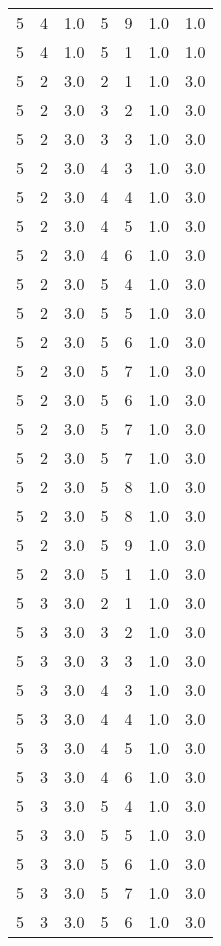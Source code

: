 \documentclass[a4paper,12pt]{article}
\begin{document}
\begin{center}
\begin{longtable}{ c c c | c c c | c }
        5 & 4 & 1.0 & 5 & 9 & 1.0 & 1.0 \\
        5 & 4 & 1.0 & 5 & 1 & 1.0 & 1.0 \\
        5 & 2 & 3.0 & 2 & 1 & 1.0 & 3.0 \\
        5 & 2 & 3.0 & 3 & 2 & 1.0 & 3.0 \\
        5 & 2 & 3.0 & 3 & 3 & 1.0 & 3.0 \\
        5 & 2 & 3.0 & 4 & 3 & 1.0 & 3.0 \\
        5 & 2 & 3.0 & 4 & 4 & 1.0 & 3.0 \\
        5 & 2 & 3.0 & 4 & 5 & 1.0 & 3.0 \\
        5 & 2 & 3.0 & 4 & 6 & 1.0 & 3.0 \\
        5 & 2 & 3.0 & 5 & 4 & 1.0 & 3.0 \\
        5 & 2 & 3.0 & 5 & 5 & 1.0 & 3.0 \\
        5 & 2 & 3.0 & 5 & 6 & 1.0 & 3.0 \\
        5 & 2 & 3.0 & 5 & 7 & 1.0 & 3.0 \\
        5 & 2 & 3.0 & 5 & 6 & 1.0 & 3.0 \\
        5 & 2 & 3.0 & 5 & 7 & 1.0 & 3.0 \\
        5 & 2 & 3.0 & 5 & 7 & 1.0 & 3.0 \\
        5 & 2 & 3.0 & 5 & 8 & 1.0 & 3.0 \\
        5 & 2 & 3.0 & 5 & 8 & 1.0 & 3.0 \\
        5 & 2 & 3.0 & 5 & 9 & 1.0 & 3.0 \\
        5 & 2 & 3.0 & 5 & 1 & 1.0 & 3.0 \\
        5 & 3 & 3.0 & 2 & 1 & 1.0 & 3.0 \\
        5 & 3 & 3.0 & 3 & 2 & 1.0 & 3.0 \\
        5 & 3 & 3.0 & 3 & 3 & 1.0 & 3.0 \\
        5 & 3 & 3.0 & 4 & 3 & 1.0 & 3.0 \\
        5 & 3 & 3.0 & 4 & 4 & 1.0 & 3.0 \\
        5 & 3 & 3.0 & 4 & 5 & 1.0 & 3.0 \\
        5 & 3 & 3.0 & 4 & 6 & 1.0 & 3.0 \\
        5 & 3 & 3.0 & 5 & 4 & 1.0 & 3.0 \\
        5 & 3 & 3.0 & 5 & 5 & 1.0 & 3.0 \\
        5 & 3 & 3.0 & 5 & 6 & 1.0 & 3.0 \\
        5 & 3 & 3.0 & 5 & 7 & 1.0 & 3.0 \\
        5 & 3 & 3.0 & 5 & 6 & 1.0 & 3.0 \\

\end{longtable}
\end{center}
\end{document}
